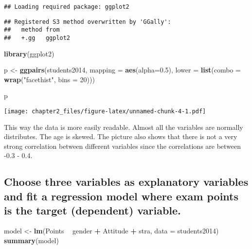 \documentclass[]{article}
\newenvironment{Shaded}{\begin{snugshade}}{\end{snugshade}}
\newcommand{\DataTypeTok}[1]{\textcolor[rgb]{0.13,0.29,0.53}{#1}}
\newcommand{\DecValTok}[1]{\textcolor[rgb]{0.00,0.00,0.81}{#1}}
\newcommand{\FloatTok}[1]{\textcolor[rgb]{0.00,0.00,0.81}{#1}}
\newcommand{\KeywordTok}[1]{\textcolor[rgb]{0.13,0.29,0.53}{\textbf{#1}}}
\newcommand{\NormalTok}[1]{#1}
\newcommand{\OperatorTok}[1]{\textcolor[rgb]{0.81,0.36,0.00}{\textbf{#1}}}
\newcommand{\StringTok}[1]{\textcolor[rgb]{0.31,0.60,0.02}{#1}}
\begin{document}
\begin{verbatim}
## Loading required package: ggplot2
\end{verbatim}

\begin{verbatim}
## Registered S3 method overwritten by 'GGally':
##   method from   
##   +.gg   ggplot2
\end{verbatim}

\begin{Shaded}
\begin{Highlighting}[]
\KeywordTok{library}\NormalTok{(ggplot2)}

\NormalTok{p <-}\StringTok{ }\KeywordTok{ggpairs}\NormalTok{(students2014, }\DataTypeTok{mapping =} \KeywordTok{aes}\NormalTok{(}\DataTypeTok{alpha=}\FloatTok{0.5}\NormalTok{), }\DataTypeTok{lower =} \KeywordTok{list}\NormalTok{(}\DataTypeTok{combo =} \KeywordTok{wrap}\NormalTok{(}\StringTok{"facethist"}\NormalTok{, }\DataTypeTok{bins =} \DecValTok{20}\NormalTok{)))}

\NormalTok{p}
\end{Highlighting}
\end{Shaded}

\texttt{[image: chapter2\_files/figure-latex/unnamed-chunk-4-1.pdf]}

This way the data is more easily readable. Almost all the variables are
normally distributes. The age is skewed. The picture also shows that
there is not a very strong correlation between different variables since
the correlations are between -0.3 - 0.4.

\hypertarget{choose-three-variables-as-explanatory-variables-and-fit-a-regression-model-where-exam-points-is-the-target-dependent-variable.}{%
\subsection{Choose three variables as explanatory variables and fit a
regression model where exam points is the target (dependent)
variable.}\label{choose-three-variables-as-explanatory-variables-and-fit-a-regression-model-where-exam-points-is-the-target-dependent-variable.}}

\begin{Shaded}
\begin{Highlighting}[]
\NormalTok{model <-}\StringTok{ }\KeywordTok{lm}\NormalTok{(Points }\OperatorTok{~}\StringTok{ }\NormalTok{gender }\OperatorTok{+}\StringTok{ }\NormalTok{Attitude }\OperatorTok{+}\StringTok{ }\NormalTok{stra, }\DataTypeTok{data =}\NormalTok{ students2014)}
\KeywordTok{summary}\NormalTok{(model)}
\end{Highlighting}
\end{Shaded}
\end{document}
